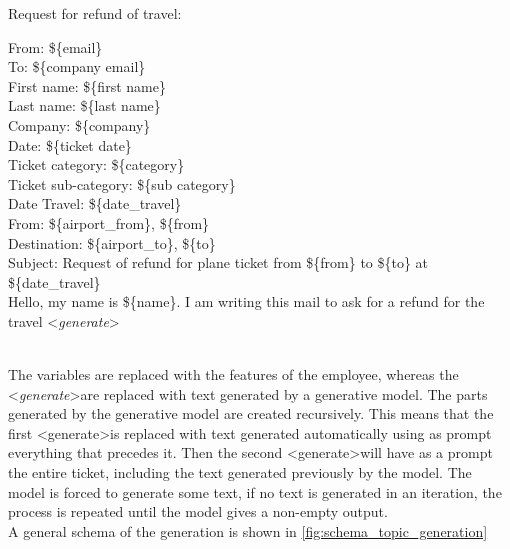 Request for refund of travel:
\begin{adjustwidth}{1cm}{}
From: \$\{email\} \\
To: \$\{company email\} \\
First name: \$\{first name\}\\
Last name: \$\{last name\}\\
Company: \$\{company\}\\
Date: \$\{ticket date\}\\
Ticket category: \$\{category\}\\
Ticket sub-category: \$\{sub category\} \\
Date Travel: \$\{date\_travel\} \\
From: \$\{airport\_from\}, \$\{from\} \\
Destination: \$\{airport\_to\}, \$\{to\} \\
Subject: Request of refund for plane ticket from \$\{from\} to \$\{to\} at \$\{date\_travel\}
\\
Hello, my name is \$\{name\}. I am writing this mail to ask for a refund for the travel \textless \textit{generate}\textgreater \\ \\

\end{adjustwidth}
        
The variables are replaced with the features of the employee, whereas the \textless \textit{generate}\textgreater \space are replaced with text generated by a generative model. The parts generated by the generative model are created recursively. This means that the first \textless generate\textgreater \space is replaced with text generated automatically using as prompt everything that precedes it. Then the second \textless generate\textgreater \space will have as a prompt the entire ticket, including the text generated previously by the model. The model is forced to generate some text, if no text is generated in an iteration, the process is repeated until the model gives a non-empty output. \\
A general schema of the generation is shown in \autoref{fig:schema_topic_generation}

